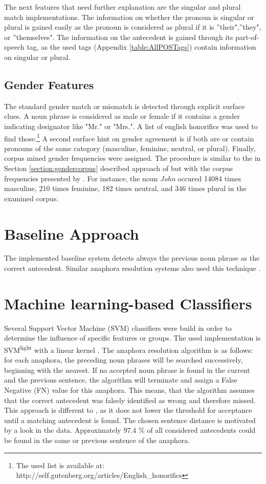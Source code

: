 The next features that need further explanation are the singular and plural match implementations. The information on whether the pronoun is singular or plural is gained easily as the pronoun is considered as plural if it is ''their",''they", or ''themselves". The information on the antecedent is gained through its part-of-speech tag, as the used tags (Appendix \ref{table:AllPOSTags}) contain information on singular or plural.

\subsection{Gender Features}
The standard gender match or mismatch is detected through explicit surface clues. A noun phrase is considered as male or female if it contains a gender indicating designator like "Mr." or "Mrs.". A list of english honorifics was used to find those.\footnote{The used list is available at: http://self.gutenberg.org/articles/English\_honorifics} A second surface hint on gender agreement is if both are or contain pronouns of the same category (masculine, feminine, neutral, or plural).
Finally, corpus mined gender frequencies were assigned. The procedure is similar to the in Section \ref{section:gendercorpus} described approach of \cite{bergsma2005automatic} but with the corpus frequencies presented by \cite{Bergsma:06}. For instance, the noun \textit{John} occured 14084 times masculine, 210 times feminine, 182 times neutral, and 346 times plural in the examined corpus. 

\section{Baseline Approach}
The implemented baseline system detects always the previous noun phrase as the correct antecedent. Similar anaphora resolution systems also used this technique \citep{poesio2004general,bergsma2005automatic}.

\section{Machine learning-based Classifiers}
Several Support Vector Machine (SVM) classifiers were build in order to determine the influence of specific features or groups. The used implementation is SVM\textsuperscript{light} with a linear kernel \citep{joachims1999svmlight}. The anaphora resolution algorithm is as follows: for each anaphora, the preceding noun phrases will be searched successively, beginning with the nearest. If no accepted noun phrase is found in the current and the previous sentence, the algorithm will terminate and assign a False Negative (FN) value for this anaphora. This means, that the algorithm assumes that the correct antecedent was falsely identified as wrong and therefore missed. This approach is different to \cite{bergsma2005automatic}, as it does not lower the threshold for acceptance until a matching antecedent is found. The chosen sentence distance is motivated by a look in the data. Approximately 97.4 \% of all considered antecedents could be found in the same or previous sentence of the anaphora.